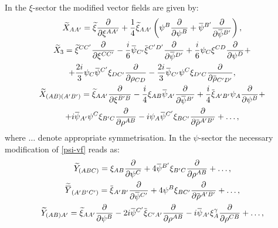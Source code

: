 \documentclass[a4paper,12pt]{article}
\numberwithin{equation}{section} %
\renewcommand{\tilde}{\widetilde}
\numberwithin{equation}{section}
\newcommand{\overbar}[1]{\mkern 1.5mu\overline{\mkern-1.5mu#1\mkern-1.5mu}\mkern 1.5mu}
\newcommand{\psibar}{\overbar{\psi}}
\newcommand{\rhobar}{\overbar{\rho}}
\newcommand{\xitilde}{\tilde{\xi}}
\newcommand{\xibar}{\overbar{\xi}}
\newcommand{\alphadot}{{A^\prime}}
\newcommand{\betadot}{{B^\prime}}
\newcommand{\gammadot}{{C^\prime}}
\newcommand{\deltadot}{{D^\prime}}
\newcommand{\B}{{B}}
\newcommand{\C}{{C}}
\begin{document}
\begin{appendix}
In the $\xi$-sector the modified  vector fields are given by:
\begin{equation}
\begin{gathered}
    \tilde{X}_{A\alphadot} = \xitilde \frac{\partial}{\partial \xi^{A\alphadot}} + \frac{1}{4}\xitilde_{A\alphadot}\left(\psi^\B\frac{\partial}{\partial \psi^\B}+\psibar^\betadot\frac{\partial}{\partial \psibar^\betadot}\right),
    \\
    \tilde{X}_3 = \xitilde^{\C\gammadot}\frac{\partial}{\partial \xi^{\C\gammadot}} -\frac{i}{6}\psibar_\gammadot\xibar^{\gammadot\deltadot}\frac{\partial}{\partial \psibar^\deltadot} +  \frac{i}{6}\psi_\C\xi^{\C D}\frac{\partial}{\partial \psi^D} + \\
    +\frac{2i}{3}\psi_\C\psibar^\gammadot\xi_{D\gammadot}\frac{\partial}{\partial \rho_{\C D}}- \frac{2i}{3}\psibar_\gammadot\psi^\C\xi_{\deltadot\C}\frac{\partial}{\partial \rhobar_{\gammadot\deltadot}},\\
    \tilde{X}_{(A\B) (\alphadot\betadot)} = \xitilde_{A \alphadot}\frac{\partial}{\partial \xi^{\betadot\B}} - \frac{i}{4}\xi_{A\B}\psibar_\alphadot\frac{\partial}{\partial \psibar^\betadot} + \frac{i}{4}\xibar_{\alphadot\betadot}\psi_A\frac{\partial}{\partial \psi^\B}+
    \\
    +i\psibar_\alphadot\psi^\C\xi_{\betadot\C}\frac{\partial}{\partial \rho^{A\B}} - i\psi_A\psibar^\gammadot\xi_{\B\gammadot}\frac{\partial}{\partial \rhobar^{\alphadot\betadot}}+\dots,
\end{gathered}
\end{equation}
where $\dots$ denote appropriate symmetrisation. In the $\psi$-sector the necessary modification of \eqref{psi-vf} reads as:
\begin{equation}\label{Supergravity kernel psi-sector corrected}
\begin{gathered}
 \tilde{Y}_{(A\B\C)} = \xi_{A\B}\frac{\partial}{\partial \psi^\C} + 4\psibar^\betadot\xi_{\betadot\C}\frac{\partial}{\partial \rho^{A\B}} +\dots , \\
 \tilde{\overbar{Y}}_{(\alphadot\betadot\gammadot)}=\xibar_{\alphadot\betadot}\frac{\partial}{\partial \psibar^\gammadot}  +4\psi^\B\xi_{\B\gammadot}\frac{\partial}{\partial \rhobar^{\alphadot\betadot}}+ \dots,\\
 \tilde{Y}_{(A\B)\alphadot} = \xitilde_{A\alphadot}\frac{\partial}{\partial \psi^\B}-2i\psibar^\gammadot\xibar_{\gammadot\alphadot}\frac{\partial}{\partial \rho^{A\B}}-i \psibar_\alphadot \xi^\gamma_A \frac{\partial}{\partial \rho^{\C\B}}+ \dots, \\

\end{gathered}
\end{equation}
\end{appendix}
\end{document}
